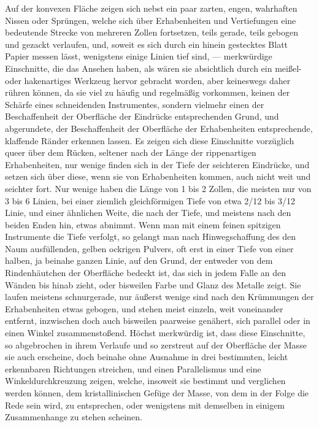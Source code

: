 \documentclass[a4paper, 11pt, oneside, german]{article}
\begin{document}
Auf der konvexen Fläche zeigen sich nebst ein paar zarten, engen, wahrhaften Nissen oder Sprüngen, welche sich über Erhabenheiten und Vertiefungen eine bedeutende Strecke von mehreren Zollen fortsetzen, teils gerade, teils gebogen und gezackt verlaufen, und, soweit es sich durch ein hinein gestecktes Blatt Papier messen lässt, wenigstens einige Linien tief sind, --- merkwürdige Einschnitte, die das Ansehen haben, als wären sie absichtlich durch ein meißel- oder hakenartiges Werkzeug hervor gebracht worden, aber keineswegs daher rühren können, da sie viel zu häufig und regelmäßig vorkommen, keinen der Schärfe eines schneidenden Instrumentes, sondern vielmehr einen der Beschaffenheit der Oberfläche der Eindrücke entsprechenden Grund, und abgerundete, der Beschaffenheit der Oberfläche der Erhabenheiten entsprechende, klaffende Ränder erkennen lassen. Es zeigen sich diese Einschnitte vorzüglich queer über dem Rücken, seltener nach der Länge der rippenartigen Erhabenheiten, nur wenige finden sich in der Tiefe der seichteren Eindrücke, und setzen sich über diese, wenn sie von Erhabenheiten kommen, auch nicht weit und seichter fort. Nur wenige haben die Länge von 1 bis 2 Zollen, die meisten nur von 3 bis 6 Linien, bei einer ziemlich gleichförmigen Tiefe von etwa 2/12 bis 3/12 Linie, und einer ähnlichen Weite, die nach der Tiefe, und meistens nach den beiden Enden hin, etwas abnimmt. Wenn man mit einem feinen spitzigen Instrumente die Tiefe verfolgt, so gelangt man nach Hinwegschaffung des den Naum ausfüllenden, gelben ockrigen Pulvers, oft erst in einer Tiefe von einer halben, ja beinahe ganzen Linie, auf den Grund, der entweder von dem Rindenhäutchen der Oberfläche bedeckt ist, das sich in jedem Falle an den Wänden bis hinab zieht, oder bisweilen Farbe und Glanz des Metalle zeigt. Sie laufen meistens schnurgerade, nur äußerst wenige sind nach den Krümmungen der Erhabenheiten etwas gebogen, und stehen meist einzeln, weit voneinander entfernt, inzwischen doch auch bisweilen paarweise genähert, sich parallel oder in einen Winkel zusammenstoßend. Höchst merkwürdig ist, dass diese Einschnitte, so abgebrochen in ihrem Verlaufe und so zerstreut auf der Oberfläche der Masse sie auch erscheine, doch beinahe ohne Ausnahme in drei bestimmten, leicht erkennbaren Richtungen streichen, und einen Parallelismus und eine Winkeldurchkreuzung zeigen, welche, insoweit sie bestimmt und verglichen werden können, dem kristallinischen Gefüge der Masse, von dem in der Folge die Rede sein wird, zu entsprechen, oder wenigstens mit demselben in einigem Zusammenhange zu stehen scheinen.
\end{document}
